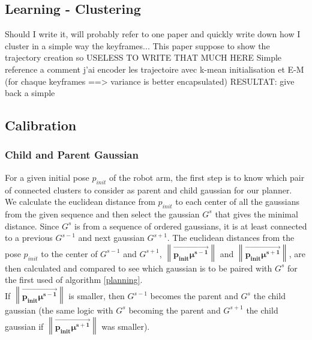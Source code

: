\documentclass[letterpaper, 10 pt, conference]{ieeeconf}  %
\newcommand{\mb}[1]{{\boldsymbol{#1}}}
\newcommand\norm[1]{\left\lVert#1\right\rVert}
\begin{document}
\subsection{Learning - Clustering}
Should I write it, will probably refer to one paper and quickly write down how I cluster in a simple way the keyframes...
This paper suppose to show the trajectory creation so USELESS TO WRITE THAT MUCH HERE
Simple reference a comment j'ai encoder les trajectoire avec k-mean initialisation et E-M  (for chaque keyframes ==> variance is better encapsulated)
RESULTAT:
give back a simple 
\subsection{Calibration}
\subsubsection{Child and Parent Gaussian}\leavevmode\par
For a given initial pose $p_{init}$ of the robot arm, the first step is to know which pair of connected clusters to consider as parent and child gaussian for our planner.\\
We calculate the euclidean distance from $p_{init}$ to each center of all the gaussians from the given sequence and then select the gaussian $G^s$ that gives the minimal distance.
Since $G^{s}$ is from a sequence of ordered gaussians, it is at least connected to a previous $G^{s-1}$ and next gaussian $G^{s+1}$.  The euclidean distances from the pose $p_{init}$ to the center of $G^{s-1}$ and $G^{s+1}$, $\norm{\overrightarrow{\mb{p_{init}}\mb{\mu^{s-1}}}}$ and $\norm{\overrightarrow{\mb{p_{init}}\mb{\mu^{s+1}}}}$, are then calculated and compared to see which gaussian is to be paired with $G^s$ for the first used of algorithm \ref{planning}.\\
If $\norm{\overrightarrow{\mb{p_{init}}\mb{\mu^{s-1}}}}$ is smaller, then $G^{s-1}$ becomes the parent and $G^{s}$ the child gaussian (the same logic with  $G^{s}$ becoming the parent and $G^{s+1}$ the child gaussian if $\norm{\overrightarrow{\mb{p_{init}}\mb{\mu^{s+1}}}}$ was smaller).\\
\end{document}
